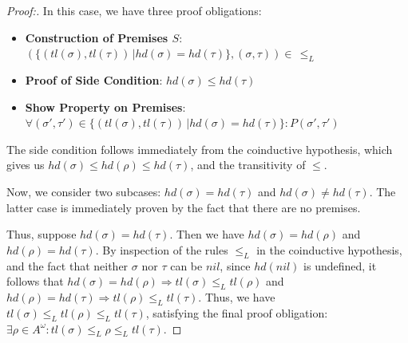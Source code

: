 \begin{proof}[Proof:]
In this case, we have three proof obligations:
\begin{itemize}
\item[] \textbf{Construction of Premises $S$}: $(\{(tl(\sigma),tl(\tau)) \,| hd(\sigma) = hd(\tau)\},(\sigma,\tau)) \in \,\le_{L}$
\item[] \textbf{Proof of Side Condition}: $hd(\sigma) \le hd(\tau)$
\item[] \textbf{Show Property on Premises}: $\forall (\sigma',\tau') \in \{(tl(\sigma),tl(\tau)) \,| hd(\sigma) = hd(\tau)\}: P(\sigma',\tau')$
\end{itemize}

The side condition follows immediately from the coinductive hypothesis, which gives us $hd(\sigma) \le hd(\rho) \le hd(\tau)$, and the transitivity of $\le$.

Now, we consider two subcases: $hd(\sigma) = hd(\tau)$ and $hd(\sigma) \not= hd(\tau)$. The latter case is immediately proven by the fact that there are no premises. 

Thus, suppose $hd(\sigma) = hd(\tau)$. Then we have $hd(\sigma) = hd(\rho)$ and $hd(\rho) = hd(\tau)$. By inspection of the rules $\le_{L}$ in the coinductive hypothesis, and the fact that neither $\sigma$ nor $\tau$ can be $nil$, since $hd(nil)$ is undefined, it follows that $hd(\sigma) = hd(\rho) \Rightarrow tl(\sigma) \le_{L} tl(\rho)$ and $hd(\rho) = hd(\tau) \Rightarrow tl(\rho) \le_{L} tl(\tau)$. Thus, we have $tl(\sigma) \le_{L} tl(\rho) \le_{L} tl(\tau)$, satisfying the final proof obligation: $\exists \rho \in A^\omega: tl(\sigma) \le_{L} \rho \le_{L} tl(\tau)$.

\end{proof}


